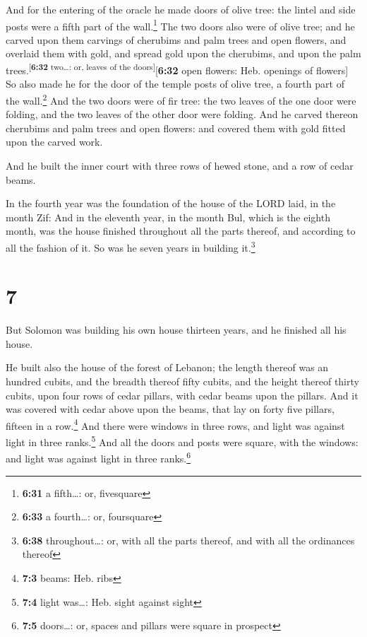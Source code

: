  And for the entering of the oracle he made doors of
olive tree: the lintel and side posts were a fifth part of the
wall.\footnote{\textbf{6:31} a fifth\ldots: or, fivesquare}
 The two doors also were of olive tree; and he carved
upon them carvings of cherubims and palm trees and open flowers, and
overlaid them with gold, and spread gold upon the cherubims, and upon
the palm trees.\textsuperscript{{[}\textbf{6:32} two\ldots: or, leaves
of the doors{]}}{[}\textbf{6:32} open flowers: Heb. openings of
flowers{]}  So also made he for the door of the temple
posts of olive tree, a fourth part of the wall.\footnote{\textbf{6:33} a
  fourth\ldots: or, foursquare}  And the two doors were
of fir tree: the two leaves of the one door were folding, and the two
leaves of the other door were folding.  And he carved
thereon cherubims and palm trees and open flowers: and covered them with
gold fitted upon the carved work.

 And he built the inner court with three rows of hewed
stone, and a row of cedar beams.

 In the fourth year was the foundation of the house of
the LORD laid, in the month Zif:  And in the eleventh
year, in the month Bul, which is the eighth month, was the house
finished throughout all the parts thereof, and according to all the
fashion of it. So was he seven years in building it.\footnote{\textbf{6:38}
  throughout\ldots: or, with all the parts thereof, and with all the
  ordinances thereof}

\hypertarget{section-6}{%
\section{7}\label{section-6}}

 But Solomon was building his own house thirteen years,
and he finished all his house.

 He built also the house of the forest of Lebanon; the
length thereof was an hundred cubits, and the breadth thereof fifty
cubits, and the height thereof thirty cubits, upon four rows of cedar
pillars, with cedar beams upon the pillars.  And it was
covered with cedar above upon the beams, that lay on forty five pillars,
fifteen in a row.\footnote{\textbf{7:3} beams: Heb. ribs} 
And there were windows in three rows, and light was against light in
three ranks.\footnote{\textbf{7:4} light was\ldots: Heb. sight against
  sight}  And all the doors and posts were square, with
the windows: and light was against light in three ranks.\footnote{\textbf{7:5}
  doors\ldots: or, spaces and pillars were square in prospect}

